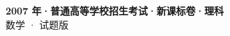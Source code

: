 \documentclass[zihao=-4, a4paper]{ctexart}
\begin{document}
\begin{center}
  {\Large\bfseries 2007 年·普通高等学校招生考试·新课标卷·理科}\\[4pt]
  {\large 数学 · 试题版}
\end{center}
\medskip
{}

\end{document}
